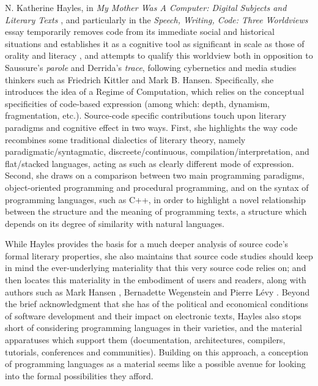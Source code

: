 N. Katherine Hayles, in \emph{My Mother Was A Computer: Digital Subjects and Literary Texts} \citep{hayles_my_2010}, and particularly in the \emph{Speech, Writing, Code: Three Worldviews} essay temporarily removes code from its immediate social and historical situations and establishes it as a cognitive tool as significant in scale as those of orality and literacy \citep{ong_orality_2012}, and attempts to qualify this worldview both in opposition to Saussure's \emph{parole} and Derrida's \emph{trace}, following cybernetics and media studies thinkers such as Friedrich Kittler and Mark B. Hansen. Specifically, she introduces the idea of a Regime of Computation, which relies on the conceptual specificities of code-based expression (among which: depth, dynamism, fragmentation, etc.). Source-code specific contributions touch upon literary paradigms and cognitive effect in two ways. First, she highlights the way code recombines some traditional dialectics of literary theory, namely paradigmatic/syntagmatic, discreete/continuous, compilation/interpretation, and flat/stacked languages, acting as such as clearly different mode of expression. Second, she draws on a comparison between two main programming paradigms, object-oriented programming and procedural programming, and on the syntax of programming languages, such as C++, in order to highlight a novel relationship between the structure and the meaning of programming texts, a structure which depends on its degree of similarity with natural languages.

While Hayles provides the basis for a much deeper analysis of source code's formal literary properties, she also maintains that source code studies should keep in mind the ever-underlying materiality that this very source code relies on; and then locates this materiality in the embodiment of users and readers, along with authors such as Mark Hansen \citep{hansen_bodies_2006}, Bernadette Wegenstein \citep{wegenstein_bodies_2010} and Pierre Lévy \citep{levy_programmation_1992}. Beyond the brief acknowledgment that she has of the political and economical conditions of software development and their impact on electronic texts, Hayles also stops short of considering programming languages in their varieties, and the material apparatuses which support them (documentation, architectures, compilers, tutorials, conferences and communities). Building on this approach, a conception of programming languages as a material seems like a possible avenue for looking into the formal possibilities they afford.

